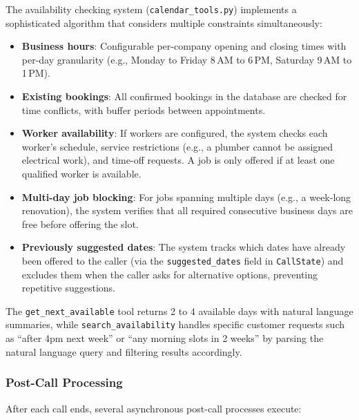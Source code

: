 \documentclass[conference]{IEEEtran}
\begin{document}
The availability checking system (\texttt{calendar\_tools.py}) implements a sophisticated algorithm that considers multiple constraints simultaneously:

\begin{itemize}
\item \textbf{Business hours}: Configurable per-company opening and closing times with per-day granularity (e.g., Monday to Friday 8\,AM to 6\,PM, Saturday 9\,AM to 1\,PM).
\item \textbf{Existing bookings}: All confirmed bookings in the database are checked for time conflicts, with buffer periods between appointments.
\item \textbf{Worker availability}: If workers are configured, the system checks each worker's schedule, service restrictions (e.g., a plumber cannot be assigned electrical work), and time-off requests. A job is only offered if at least one qualified worker is available.
\item \textbf{Multi-day job blocking}: For jobs spanning multiple days (e.g., a week-long renovation), the system verifies that all required consecutive business days are free before offering the slot.
\item \textbf{Previously suggested dates}: The system tracks which dates have already been offered to the caller (via the \texttt{suggested\_dates} field in \texttt{CallState}) and excludes them when the caller asks for alternative options, preventing repetitive suggestions.
\end{itemize}

The \texttt{get\_next\_available} tool returns 2 to 4 available days with natural language summaries, while \texttt{search\_availability} handles specific customer requests such as ``after 4pm next week'' or ``any morning slots in 2 weeks'' by parsing the natural language query and filtering results accordingly.


\subsubsection{Post-Call Processing}

After each call ends, several asynchronous post-call processes execute:
\end{document}
